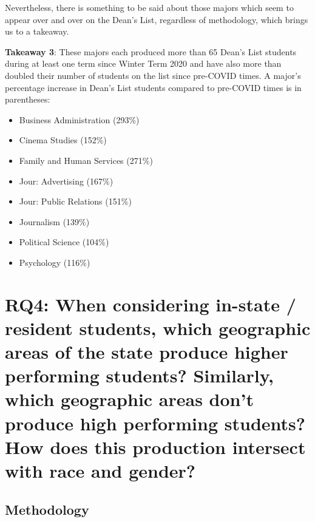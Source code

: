 \documentclass[10]{article}
\begin{document}
Nevertheless, there is something to be said about those majors which seem to appear over and over on the Dean's List, regardless of methodology, which brings us to a takeaway.


\textbf{Takeaway 3}: These majors each produced more than 65 Dean's List students during at least one term since Winter Term 2020 and have also more than doubled their number of students on the list since pre-COVID times. A major's percentage increase in Dean's List students compared to pre-COVID times is in parentheses: 
\begin{itemize}
	\item Business Administration (293\%)
	\item Cinema Studies (152\%)
	\item Family and Human Services (271\%)
	\item Jour: Advertising (167\%)
	\item Jour: Public Relations (151\%)
	\item Journalism (139\%)
	\item Political Science (104\%)
	\item Psychology (116\%)
\end{itemize}

\section{RQ4: When considering in-state / resident students, which geographic areas of the state produce higher performing students? Similarly, which geographic areas don't produce high performing students? How does this production intersect with race and gender?}

\subsection{Methodology}
\end{document}
